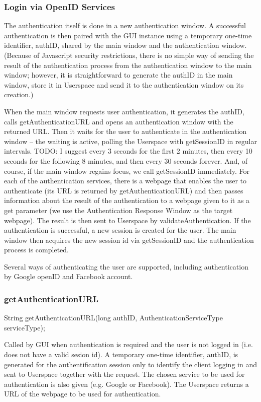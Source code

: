 \subsubsection{Login via OpenID Services}

The authentication itself is done in a new authentication window.
A successful authentication is then paired with the GUI instance using a temporary one-time identifier, authID, shared by the main window and the authentication window.
(Because of Javascript security restrictions, there is no simple way of sending the result of the authentication process from the authentication window to the main window;
however, it is straightforward to generate the authID in the main window, store it in Userspace and send it to the authentication window on its creation.)

When the main window requests user authentication, it generates the authID, calls getAuthenticationURL and opens an authentication window with the returned URL.
Then it waits for the user to authenticate in the authentication window
-- the waiting is active, polling the Userspace with getSessionID in regular intervals.
TODO: I suggest every 3 seconds for the first 2 minutes, then every 10 seconds for the following 8 minutes, and then every 30 seconds forever.
And, of course, if the main window regains focus, we call getSessionID immediately.
For each of the authentication services, there is a webpage that enables the user to authenticate
(its URL is returned by getAuthenticationURL)
and then passes information about the result of the authentication to a webpage given to it as a get parameter
(we use the Authentication Response Window as the target webpage).
The result is then sent to Userspace by validateAuthentication.
If the authentication is successful, a new session is created for the user.
The main window then acquires the new session id via getSessionID and the authentication process is completed.

Several ways of authenticating the user are supported, including authentication by Google openID and Facebook account.

\subsubsection{getAuthenticationURL}
    String getAuthenticationURL(long authID, AuthenticationServiceType serviceType);

Called by GUI when authentication is required and the user is not logged in (i.e. does not have a valid sesion id).
A temporary one-time identifier, authID, is generated for the authentification session only to identify the client logging in and sent to Userspace together with the request.
The chosen service to be used for authentication is also given (e.g. Google or Facebook).
The Userspace returns a URL of the webpage to be used for authentication.

